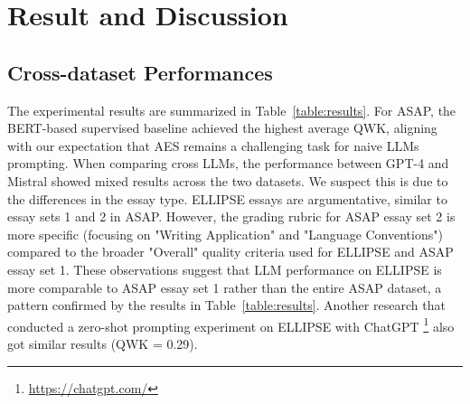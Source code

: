 \section{Result and Discussion}
\label{discussion}

\subsection{Cross-dataset Performances}
\label{cross-dataset-performances}
The experimental results are summarized in Table~\ref{table:results}. For ASAP, the BERT-based supervised baseline achieved the highest average QWK, aligning with our expectation that AES remains a challenging task for naive LLMs prompting. When comparing cross LLMs, the performance between GPT-4 and Mistral showed mixed results across the two datasets.
We suspect this is due to the differences in the essay type. ELLIPSE essays are argumentative, similar to essay sets 1 and 2 in ASAP. However, the grading rubric for ASAP essay set 2 is more specific (focusing on "Writing Application" and "Language Conventions") compared to the broader "Overall" quality criteria used for ELLIPSE and ASAP essay set 1. These observations suggest that LLM performance on ELLIPSE is more comparable to ASAP essay set 1 rather than the entire ASAP dataset, a pattern confirmed by the results in Table~\ref{table:results}. Another research \cite{mutlitaskAESforEssayGrading} that conducted a zero-shot prompting experiment on ELLIPSE with ChatGPT \footnote{\url{https://chatgpt.com/}} also got similar results (QWK = 0.29).

